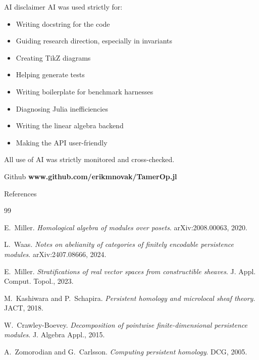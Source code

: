 \documentclass[aspectratio=169,11pt]{beamer}
\begin{document}
\begin{frame}{AI disclaimer}
	AI was used strictly for:
	\begin{itemize}
		\item Writing docstring for the code
		\item Guiding research direction, especially in invariants
		\item Creating TikZ diagrams
		\item Helping generate tests
		\item Writing boilerplate for benchmark harnesses
		\item Diagnosing Julia inefficiencies
		\item Writing the linear algebra backend
		\item Making the API user-friendly
	\end{itemize}
    
    All use of AI was strictly monitored and cross-checked.
	
\end{frame}

\begin{frame}{Github}
	\centering
	\Large{\textbf{www.github.com/erikmnovak/TamerOp.jl}}
\end{frame}



\begin{frame}{References}
	\tiny
	\begin{thebibliography}{99}
		
		E.~Miller.
		\newblock \emph{Homological algebra of modules over posets}.
		\newblock arXiv:2008.00063, 2020.
		
		L.~Waas.
		\newblock \emph{Notes on abelianity of categories of finitely encodable persistence modules}.
		\newblock arXiv:2407.08666, 2024.
		
		E.~Miller.
		\newblock \emph{Stratifications of real vector spaces from constructible sheaves}.
		\newblock J. Appl. Comput. Topol., 2023.
		
		M.~Kashiwara and P.~Schapira.
		\newblock \emph{Persistent homology and microlocal sheaf theory}.
		\newblock JACT, 2018.
		
		W.~Crawley-Boevey.
		\newblock \emph{Decomposition of pointwise finite-dimensional persistence modules}.
		\newblock J. Algebra Appl., 2015.
		
		A.~Zomorodian and G.~Carlsson.
		\newblock \emph{Computing persistent homology}.
		\newblock DCG, 2005.
		
	\end{thebibliography}
\end{frame}
\end{document}
